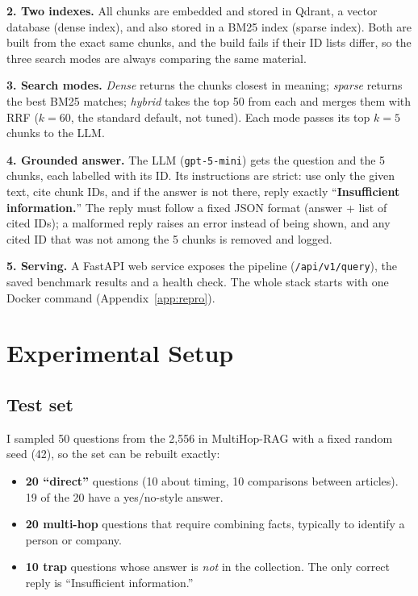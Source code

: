 \documentclass[10pt,twocolumn]{article}
\newcommand{\code}[1]{\texttt{\small #1}}
\begin{document}
\textbf{2. Two indexes.} All chunks are embedded and stored in Qdrant, a vector database (dense index), and also stored in a BM25 index (sparse index). Both are built from the exact same chunks, and the build fails if their ID lists differ, so the three search modes are always comparing the same material.

\textbf{3. Search modes.} \emph{Dense} returns the chunks closest in meaning; \emph{sparse} returns the best BM25 matches; \emph{hybrid} takes the top 50 from each and merges them with RRF ($k=60$, the standard default, not tuned). Each mode passes its top $k=5$ chunks to the LLM.

\textbf{4. Grounded answer.} The LLM (\code{gpt-5-mini}) gets the question and the 5 chunks, each labelled with its ID. Its instructions are strict: use only the given text, cite chunk IDs, and if the answer is not there, reply exactly ``\textbf{Insufficient information.}'' The reply must follow a fixed JSON format (answer + list of cited IDs); a malformed reply raises an error instead of being shown, and any cited ID that was not among the 5 chunks is removed and logged.

\textbf{5. Serving.} A FastAPI web service exposes the pipeline (\code{/api/v1/query}), the saved benchmark results and a health check. The whole stack starts with one Docker command (Appendix~\ref{app:repro}).

\section{Experimental Setup}

\subsection{Test set}
I sampled 50 questions from the 2,556 in MultiHop-RAG with a fixed random seed (42), so the set can be rebuilt exactly:

\begin{itemize}
\item \textbf{20 ``direct''} questions (10 about timing, 10 comparisons between articles). 19 of the 20 have a yes/no-style answer.
\item \textbf{20 multi-hop} questions that require combining facts, typically to identify a person or company.
\item \textbf{10 trap} questions whose answer is \emph{not} in the collection. The only correct reply is ``Insufficient information.''
\end{itemize}
\end{document}
